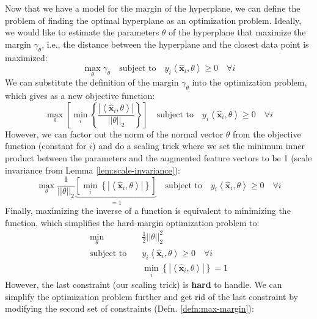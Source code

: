\documentclass{article}[11pt]
\newcommand{\norm}[1]{\left|\left|#1\right|\right|}
\begin{document}
Now that we have a model for the margin of the hyperplane, we can define the problem of finding the optimal hyperplane as an optimization problem.
Ideally, we would like to estimate the parameters $\theta$ of the hyperplane that maximize the margin $\gamma_{\theta}$, i.e., the distance between the hyperplane and the closest data point is maximized:
\begin{equation*}\label{eq:max-margin}
    \max_{\theta}\gamma_{\theta}\quad\text{subject to}\quad y_{i}\left<\hat{\mathbf{x}}_{i},\theta\right> \geq 0\quad\forall i
\end{equation*}
We can substitute the definition of the margin $\gamma_{\theta}$ into the optimization problem, which gives as a new objective function:
\begin{equation*}
    \max_{\theta}\left[\min_{i}\left\{\frac{|\left<\hat{\mathbf{x}}_{i},\theta\right>|}{\norm{\theta}_{2}}\right\}\right]\quad\text{subject to}\quad y_{i}\left<\hat{\mathbf{x}}_{i},\theta\right> \geq 0\quad\forall i
\end{equation*}
However, we can factor out the norm of the normal vector $\theta$ from the objective function (constant for $i$) and do a scaling trick
where we set the minimum inner product between the parameters and the augmented feature vectors to be 1 (scale invariance from Lemma \ref{lem:scale-invariance}):
\begin{equation*}
    \max_{\theta}\frac{1}{\norm{\theta}_{2}}\underbrace{\left[\min_{i}\left\{|\left<\hat{\mathbf{x}}_{i},\theta\right>|\right\}\right]}_{=1}\quad\text{subject to}\quad y_{i}\left<\hat{\mathbf{x}}_{i},\theta\right> \geq 0\quad\forall i
\end{equation*}
Finally, maximizing the inverse of a function is equivalent to minimizing the function, which simplifies the hard-margin optimization problem to:
\begin{align*}
    \min_{\theta}\quad & \frac{1}{2}\norm{\theta}_{2}^{2}\\
    \text{subject to}\quad & y_{i}\left<\hat{\mathbf{x}}_{i},\theta\right> \geq 0\quad\forall i\\
    & \min_{i}\left\{|\left<\hat{\mathbf{x}}_{i},\theta\right>|\right\} = 1
\end{align*}
However, the last constraint (our scaling trick) is \textbf{hard} to handle.  We can simplify the optimization problem further and get rid of the last constraint 
by modifying the second set of constraints (Defn. \ref{defn:max-margin}):
\end{document}
